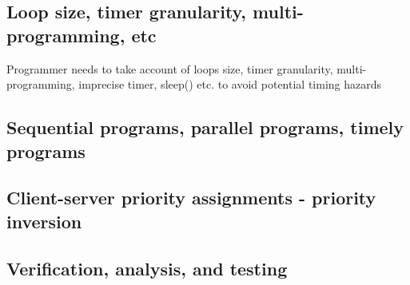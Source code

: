 \subsection{Loop size, timer granularity, multi-programming, etc}
Programmer needs to take account of loops size, timer granularity, multi-programming, imprecise timer, sleep() etc. to avoid potential timing hazards

\subsection{Sequential programs, parallel programs, timely programs}

\subsection{Client-server priority assignments - priority inversion}

\subsection{Verification, analysis, and testing}